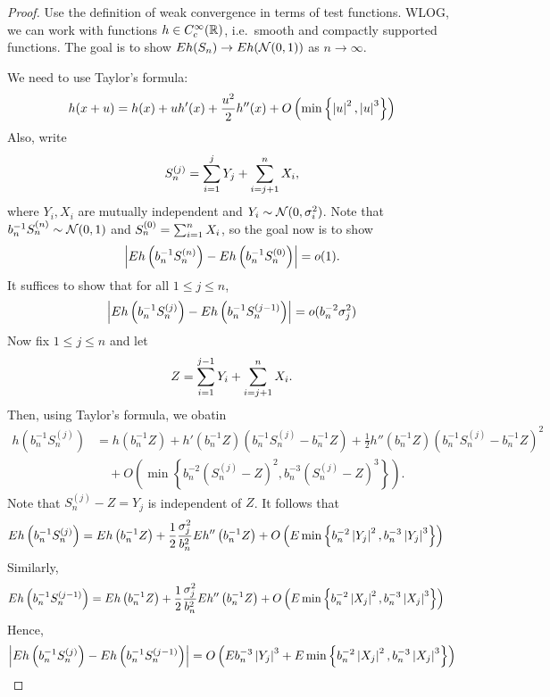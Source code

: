 \documentclass[a4paper]{article}
\begin{document}
\begin{proof}
  Use the definition of weak convergence in terms of test functions.
  WLOG, we can work with functions $h \in C^\infty_c (\mathbb{R})$, i.e.\ smooth 
  and compactly supported functions. The goal is to show 
  $E h(S_n) \to E h (\mathcal{N}(0, 1))$ as $n \to \infty$.

  We need to use Taylor's formula: 
  \[
  h (x + u) = h(x) + u h' (x) + \frac{u^2}{2} h''(x) + 
  O \left( \min \left\{ \left\lvert u\right\rvert^2, \left\lvert u\right\rvert^3 \right\} \right)
  \]
  Also, write 
  \[
  S_n^{(j)} = \sum_{i=1}^j Y_j + \sum_{i = j + 1}^n X_i,
  \]
  where $Y_i, X_i$ are mutually independent and $Y_i \sim \mathcal{N}(0, \sigma_i^2)$.
  Note that $b_n^{-1} S_n^{(n)} \sim \mathcal{N}(0, 1)$ and 
  $S_n^{(0)} = \sum_{i=1}^n X_i$, so the goal now is to show
  \[
  \left\lvert E h \left( b_n^{-1} S_n^{(n)} \right) - E h \left( b_n^{-1} S_n^{(0)} \right)\right\rvert
  = o(1).
  \]
  It suffices to show that for all $1 \leq j \leq n$,
  \[
  \left\lvert E h \left( b_n^{-1} S_n^{(j)} \right) - E h \left( b_n^{-1} S_n^{(j - 1)} \right)\right\rvert
  = o(b_n^{-2} \sigma_j^2)
  \]
  Now fix $1 \leq j \leq n$ and let 
  \[
  Z = \sum_{i=1}^{j - 1} Y_i + \sum_{i = j + 1}^n X_i.
  \]
  Then, using Taylor's formula, we obatin
  \begin{align*}
    h \left( b_n^{-1} S_n^{(j)} \right) 
    &=  h \left( b_n^{-1} Z \right) 
    + h' \left( b_n^{-1} Z \right) \left( b_n^{-1} S_n^{(j)} - b_n^{-1} Z \right)
    + \frac{1}{2} h'' \left( b_n^{-1} Z \right) \left( b_n^{-1} S_n^{(j)} - b_n^{-1} Z \right)^2 \\ 
    & \quad + O \left( \min \left\{ b_n^{-2} (S_n^{(j)} - Z)^2, 
    b_n^{-3} (S_n^{(j)} - Z)^3 \right\} \right).
  \end{align*}
  Note that $S_n^{(j)} - Z = Y_j$ is independent of $Z$.
  It follows that 
  \begin{align*}
    E h \left( b_n^{-1} S_n^{(j)} \right)
    &= E h \left( b_n^{-1} Z \right) 
    + \frac{1}{2} \frac{\sigma_j^2}{b_n^2} E h'' \left( b_n^{-1} Z \right) 
    + O \left( E \min \left\{ b_n^{-2} \left\lvert Y_j\right\rvert^{2}, 
    b_n^{-3} \left\lvert Y_j\right\rvert^3 \right\} \right)
  \end{align*}
  Similarly, 
  \begin{align*}
    E h \left( b_n^{-1} S_n^{(j - 1)} \right)
    &= E h \left( b_n^{-1} Z \right) 
    + \frac{1}{2} \frac{\sigma_j^2}{b_n^2} E h'' \left( b_n^{-1} Z \right) 
    + O \left( E \min \left\{ b_n^{-2} \left\lvert X_j\right\rvert^{2}, 
    b_n^{-3} \left\lvert X_j\right\rvert^3 \right\} \right)
  \end{align*}
  Hence, 
  \[
  \left\lvert E h\left( b_n^{-1} S_n^{(j)} \right) - E h \left( b_n^{-1} S_n^{(j - 1)} \right)\right\rvert
  = O \left( E b_n^{-3} \left\lvert Y_j\right\rvert^3 
    + E \min \left\{ b_n^{-2} \left\lvert X_j\right\rvert^{2}, 
    b_n^{-3} \left\lvert X_j\right\rvert^3 \right\} \right)
  \]


\end{proof}
\end{document}
